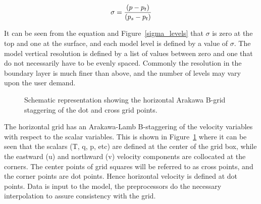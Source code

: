 \begin{eqnarray}
\sigma = {(p - p_t) \over (p_s - p_t)}
\end{eqnarray}

It can be seen from the equation and Figure~\ref{sigma_levels} that $\sigma$ is
zero at the top and one at the surface, and each model level is defined by a
value of $\sigma$. The model vertical resolution is defined by a list of values
between zero and one that do not necessarily have to be evenly spaced. Commonly
the resolution in the boundary layer is much finer than above, and the number of
levels may vary upon the user demand.

\begin{figure}
\begin{center}
\caption{Schematic representation showing the horizontal Arakawa B-grid
staggering of the dot and cross grid points.}  \label{grid}
\end{center}
\end{figure}

The horizontal grid has an Arakawa-Lamb B-staggering of the velocity variables
with respect to the scalar variables. This is shown in Figure~\ref{grid} where
it can be seen that the scalars (T, q, p, etc) are defined at the center of the
grid box, while the eastward (u) and northward (v) velocity components are
collocated at the corners. The center points of grid squares will be referred
to as cross points, and the corner points are dot points. 
Hence horizontal velocity is defined at dot points. Data is input to the model,
the preprocessors do the necessary interpolation to assure consistency with the
grid.

